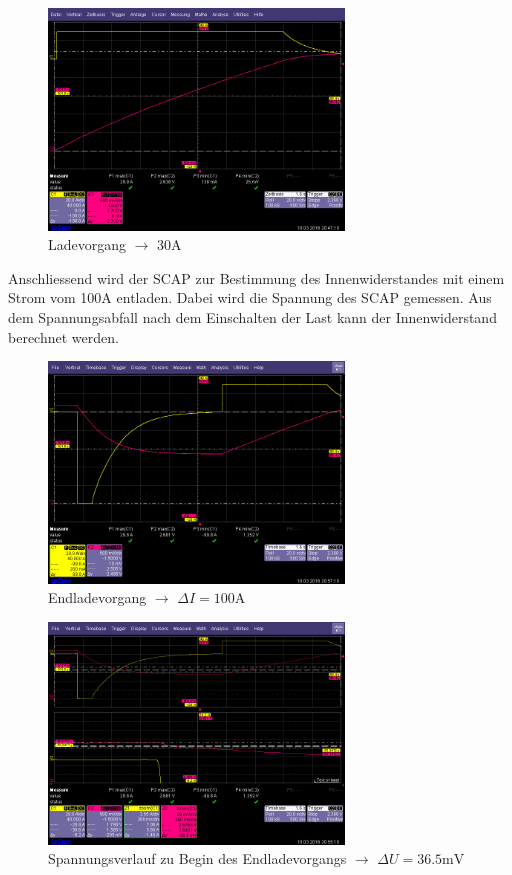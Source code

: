\documentclass[a4,paper,fleqn]{article}
\begin{document}
\begin{figure}[h!]
    \centering
    \includegraphics[width=0.7\textwidth, trim=0 20 0 45, clip=true]{fig/charge.png}
    \caption{Ladevorgang $\to$ 30\si{\ampere}}
    \label{fig:charge}
\end{figure}

\noindent
Anschliessend wird der SCAP zur Bestimmung des Innenwiderstandes mit einem 
Strom vom 100\si{\ampere} entladen. Dabei wird die Spannung des SCAP gemessen. 
Aus dem Spannungsabfall nach dem Einschalten der Last kann der Innenwiderstand 
berechnet werden. 

\begin{figure}[h!]
    \centering
    \includegraphics[width=0.7\textwidth, trim=0 20 0 45, clip=true]{fig/discharge2.png}
    \caption{Endladevorgang $\to$ $\Delta I = 100 \si{\ampere}$}
    \label{fig:discharge_i}
\end{figure}

\begin{figure}[h!]
    \centering
    \includegraphics[width=0.7\textwidth, trim=0 20 0 45, clip=true]{fig/discharge1.png}
    \caption{Spannungsverlauf zu Begin des Endladevorgangs $\to$ $\Delta U = 36.5\si{\milli\volt}$}
    \label{fig:discharge_u}
\end{figure}
\end{document}
